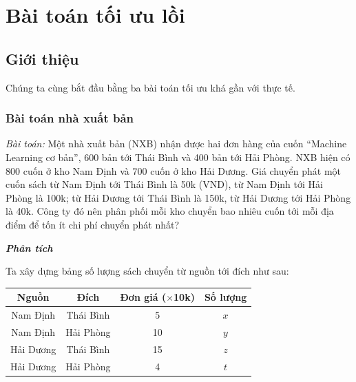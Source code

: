 \chapter{Bài toán tối ưu lồi}
\label{cha:cvxopt}

\section{Giới thiệu}
Chúng ta cùng bắt đầu bằng ba bài toán tối ưu khá gần với thực tế.

\subsection{Bài toán nhà xuất bản}

\textit{Bài toán:}
Một nhà xuất bản (NXB) nhận được hai đơn hàng của cuốn ``Machine Learning cơ bản'', 600 bản tới Thái Bình và 400 bản tới Hải Phòng. NXB hiện có 800 cuốn ở kho Nam Định và 700 cuốn ở kho Hải Dương. Giá chuyển phát một cuốn sách từ Nam Định tới Thái Bình là 50k (VND), từ Nam Định tới Hải Phòng là 100k; từ Hải Dương tới Thái Bình là 150k, từ Hải Dương tới Hải Phòng là 40k. Công ty đó nên phân phối mỗi kho chuyển bao nhiêu cuốn tới mỗi địa điểm để tốn ít chi phí chuyển phát nhất?


\textit{\textbf{Phân tích}}

Ta xây dựng bảng số lượng sách chuyển từ nguồn tới đích như sau:
\begin{table}[h]
\centering
\label{my-label}
\setlength{\tabcolsep}{0.5em}
{\normalsize {}
\begin{tabular}{|c|c|c|c|}
\hline
\textbf{Nguồn} & \textbf{Đích} & \textbf{Đơn giá ($\times$10k)} & \textbf{Số lượng} \\ \hline
Nam Định       & Thái Bình     & 5                       & $x$                 \\ \hline
Nam Định       & Hải Phòng     & 10                      & $y$                 \\ \hline
Hải Dương      & Thái Bình     & 15                      & $z$                 \\ \hline
Hải Dương      & Hải Phòng     & 4                       & $t$                \\\hline
\end{tabular}}
\end{table}

